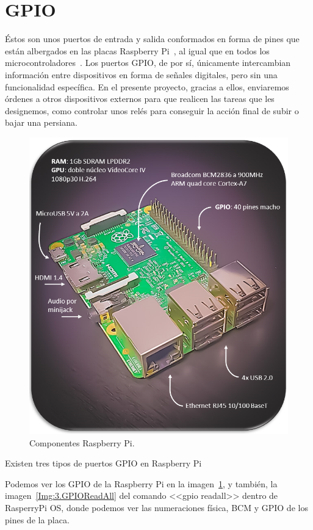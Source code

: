 \section{GPIO}\label{concepto:GPIO}
Éstos son unos puertos de entrada y salida conformados en forma de pines que están albergados en las placas Raspberry Pi~\cite{misc:RbPWeb}, al igual que en todos los microcontroladores~\cite{misc:descubrearduino}. Los puertos GPIO, de por sí, únicamente intercambian información entre dispositivos en forma de señales digitales, pero sin una funcionalidad específica. En el presente proyecto, gracias a ellos, enviaremos órdenes a otros dispositivos externos para que realicen las tareas que les designemos, como controlar unos relés para conseguir la acción final de subir o bajar una persiana.
\begin{figure}[h]
    \centering
\includegraphics[width=.7\textwidth]{img/fotos/RbP_bueno.PNG}
\caption[Componentes Raspberry Pi]{Componentes Raspberry Pi.} \label{Img:3.RaspberryPi}
\end{figure}


Existen tres tipos de puertos GPIO en Raspberry Pi

Podemos ver los GPIO de la Raspberry Pi en la imagen~\ref{Img:3.RaspberryPi}, y también, la imagen~\ref{Img:3.GPIOReadAll} del comando <<gpio readall>> dentro de RasperryPi OS, donde podemos ver las numeraciones física, BCM y GPIO de los pines de la placa.

